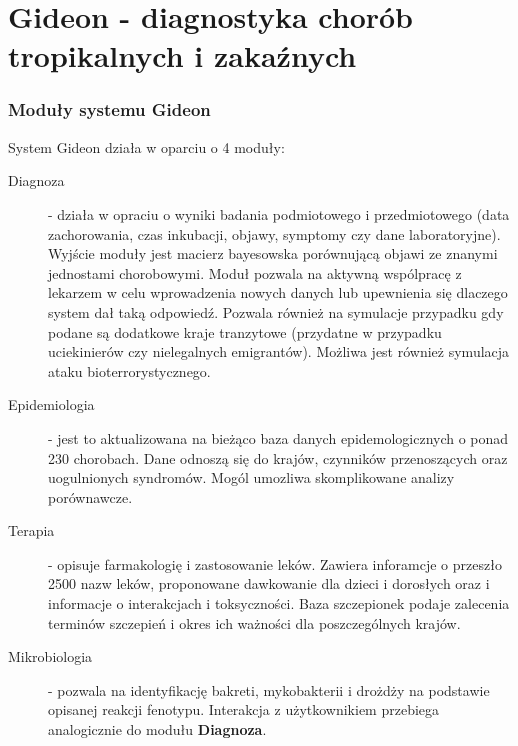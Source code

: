 \section{Gideon - diagnostyka chorób tropikalnych i zakaźnych}


\begin{frame}[allowframebreaks]
 \frametitle{Moduły systemu Gideon}

System Gideon działa w oparciu o 4 moduły:

\begin{description}
 \item[Diagnoza] - działa w opraciu o wyniki badania podmiotowego i przedmiotowego
 (data zachorowania, czas inkubacji, objawy, symptomy czy dane laboratoryjne).
 Wyjście moduły jest macierz bayesowska porównującą objawi ze znanymi
 jednostami chorobowymi. Moduł pozwala na aktywną wspólpracę z lekarzem w celu
 wprowadzenia nowych danych lub upewnienia się dlaczego system dał taką
 odpowiedź. Pozwala również na symulacje przypadku gdy podane są dodatkowe
 kraje tranzytowe (przydatne w przypadku uciekinierów czy nielegalnych
 emigrantów). Możliwa jest również symulacja ataku bioterrorystycznego.
 \framebreak
 \item[Epidemiologia] - jest to aktualizowana na bieżąco baza danych
 epidemologicznych o ponad 230 chorobach. Dane odnoszą się do krajów, czynników
 przenoszących oraz uogulnionych syndromów. Mogól umozliwa skomplikowane
 analizy porównawcze.
 \item[Terapia] - opisuje farmakologię i zastosowanie leków. Zawiera inforamcje
 o przeszło 2500 nazw leków, proponowane dawkowanie dla dzieci i dorosłych oraz
 i informacje o interakcjach i toksyczności. Baza szczepionek podaje zalecenia
 terminów szczepień i okres ich ważności dla poszczególnych krajów.
 \framebreak
 \item[Mikrobiologia] - pozwala na identyfikację bakreti, mykobakterii i
 drożdży na podstawie opisanej reakcji fenotypu. Interakcja z użytkownikiem
 przebiega analogicznie do modułu \textbf{Diagnoza}.
 

 \end{description}

\end{frame}


